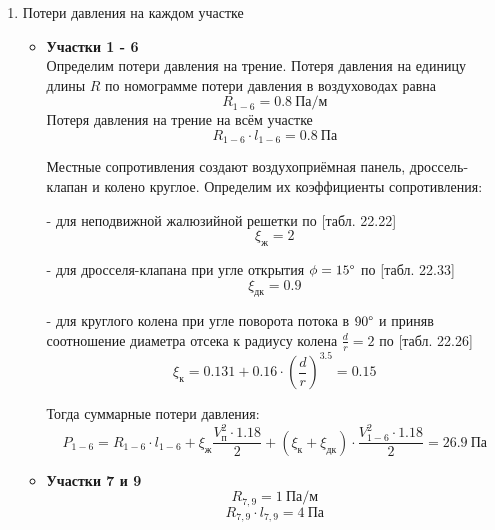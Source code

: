 \begin{enumerate}
    \item   Потери давления на каждом участке
        \begin{itemize}
            \item   \textbf{Участки 1 - 6} \\
                    Определим потери давления на трение. Потеря давления на
                    единицу длины $R$ по номограмме потери давления в воздуховодах равна
                    $$
                        R_{1-6} = 0.8 ~\text{Па/м}
                    $$
                    Потеря давления на трение на всём участке
                    $$
                        R_{1-6} \cdot l_{1-6} = 0.8 ~\text{Па}
                    $$

                    Местные сопротивления создают воздухоприёмная панель,
                    дроссель-клапан и колено круглое. Определим их коэффициенты
                    сопротивления:

                    - для неподвижной жалюзийной решетки по
                    \cite{air_ventilation_and_conditioning}[табл. 22.22]
                    $$
                        \xi_\text{ж} = 2
                    $$

                    - для дросселя-клапана при угле открытия $\phi = 15 \degree$ по
                    \cite{air_ventilation_and_conditioning}[табл. 22.33]
                    $$
                        \xi_\text{дк} = 0.9
                    $$

                    - для круглого колена при угле поворота потока в $90 \degree$
                    и приняв соотношение диаметра отсека к радиусу колена $\frac{d}{r} = 2$
                    по \cite{air_ventilation_and_conditioning}[табл. 22.26]
                    $$
                        \xi_\text{к} = 0.131 + 0.16 \cdot \left( \frac{d}{r} \right)^{3.5} = 0.15
                    $$

                    Тогда суммарные потери давления:
                    $$
                        P_{1-6} = R_{1-6} \cdot l_{1-6} + \xi_\text{ж} \frac{V_\text{п}^2 \cdot 1.18}{2}
                                    + (\xi_\text{к} + \xi_\text{дк}) \cdot \frac{V_{1-6}^2 \cdot 1.18}{2}
                                = 26.9 ~\text{Па}
                    $$

            \item   \textbf{Участки 7 и 9}
                    $$
                        R_{7,9} = 1 ~\text{Па/м}
                    $$
                    $$
                        R_{7,9} \cdot l_{7,9} = 4 ~\text{Па}
                    $$


\end{itemize}
\end{enumerate}
